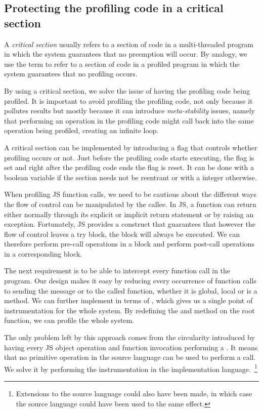 \subsection{Protecting the profiling code in a critical section} 

A \textit{critical section} usually refers to a section of code in a
multi-threaded program in which the system guarantees that no preemption will
occur. By analogy, we use the term to refer to a section of code in a profiled
program in which the system guarantees that no profiling occurs.

By using a critical section, we solve the issue of having the profiling code
being profiled. It is important to avoid profiling the profiling code, not only
because it pollutes results but mostly because it can introduce
\textit{meta-stability} issues, namely that performing an operation in the
profiling code might call back into the same operation being profiled, creating
an infinite loop.

A critical section can be implemented by introducing a flag that controls
whether profiling occurs or not. Just before the profiling code starts
executing, the flag is set and right after the profiling code ends the flag is
reset. It can be done with a boolean variable if the section needs not be
reentrant or with a integer otherwise.

When profiling JS function calls, we need to be cautious about the different
ways the flow of control can be manipulated by the callee. In JS, a function
can return either normally through its explicit or implicit return statement or
by raising an exception. Fortunately, JS provides a  construct that
guarantees that however the flow of control leaves a try block, the 
block will always be executed. We can therefore perform pre-call operations in
a  block and perform post-call operations in a corresponding
 block.

The next requirement is to be able to intercept every function call in the
program. Our design makes it easy by reducing every occurrence of function calls
to sending the message  or  to the called function, whether
it is global, local or is a method. We can further implement  in terms
of , which gives us a single point of instrumentation for the whole
system. By redefining the  and  method on the root function,
we can profile the whole system.

The only problem left by this approach comes from the circularity introduced by
having every JS object operation and function invocation performing a
. It means that no primitive operation in the source language can be
used to perform a call. We solve it by performing the instrumentation in the
implementation language.~\footnote{Extensions to the source language could also
have been made, in which case the source language could have been used to the
same effect.}

